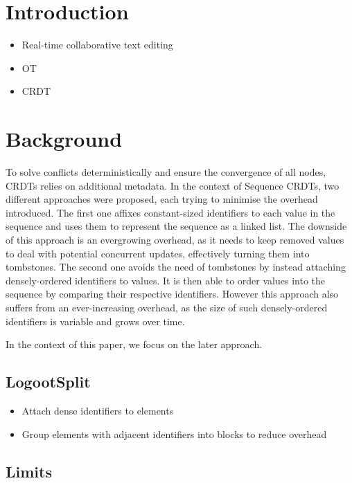 \documentclass[sigplan,10pt]{acmart}
\begin{document}
\section{Introduction}

\begin{itemize}
    \item Real-time collaborative text editing
    \item \ac{OT}
    \item \ac{CRDT}
\end{itemize}

\section{Background}

To solve conflicts deterministically and ensure the convergence of all nodes, \acp{CRDT} relies on additional metadata.
In the context of Sequence \acp{CRDT}, two different approaches were proposed, each trying to minimise the overhead introduced.
The first one affixes constant-sized identifiers to each value in the sequence and uses them to represent the sequence as a linked list.
The downside of this approach is an evergrowing overhead, as it needs to keep removed values to deal with potential concurrent updates, effectively turning them into tombstones.
The second one avoids the need of tombstones by instead attaching densely-ordered identifiers to values.
It is then able to order values into the sequence by comparing their respective identifiers.
However this approach also suffers from an ever-increasing overhead, as the size of such densely-ordered identifiers is variable and grows over time.

In the context of this paper, we focus on the later approach.

\subsection{LogootSplit}

\begin{itemize}
    \item Attach dense identifiers to elements
    \item Group elements with adjacent identifiers into blocks to reduce overhead
\end{itemize}

\subsection{Limits}
\end{document}
